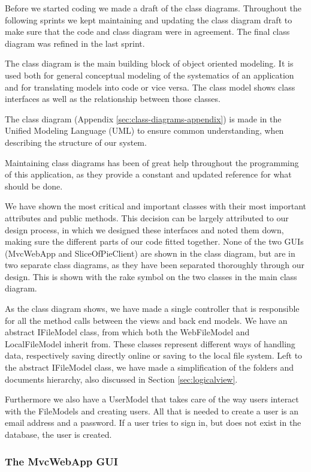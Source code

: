 Before we started coding we made a draft of the class diagrams. Throughout the following sprints we kept maintaining and updating the class diagram
draft to make sure that the code and class diagram were in agreement. The final class diagram was refined in the last sprint.

The class diagram is the main building block of object oriented modeling. It is used both for general conceptual modeling of the systematics 
of an application and for translating models into code or vice versa. The class model
shows class interfaces as well as the relationship between those classes.

The class diagram (Appendix \ref{sec:class-diagrams-appendix}) is made in the Unified Modeling Language (UML) to ensure common understanding, when describing the structure of our system.

Maintaining class diagrams has been of great help throughout the programming of this application, as they provide a constant and updated reference
for what should be done.

We have shown the most critical and important classes with their most important attributes and public methods. This decision can be largely attributed
to our design process, in which we designed these interfaces and noted them down, making sure the different parts of our code fitted together.
None of the two GUIs (MvcWebApp and SliceOfPieClient) are shown in the class diagram, but are in two separate class diagrams, as they have been separated
thoroughly through our design. This is shown with the rake symbol on the two classes in the main class diagram.

As the class diagram shows, we have made a single controller that is responsible for all the method calls between the views and back end models. We
have an abstract IFileModel class, from which both the WebFileModel and LocalFileModel inherit from. These classes represent different ways of handling
data, respectively saving directly online or saving to the local file system. Left to the abstract IFileModel class, we have
made a simplification of the folders and documents hierarchy, also discussed in Section \ref{sec:logicalview}.

Furthermore we also have a UserModel that takes care of the way users interact with the FileModels and creating users. All that is needed
to create a user is an email address and a password. If a user tries to sign in, but does not exist in the database, the user is created.

\subsubsection{The MvcWebApp GUI}

